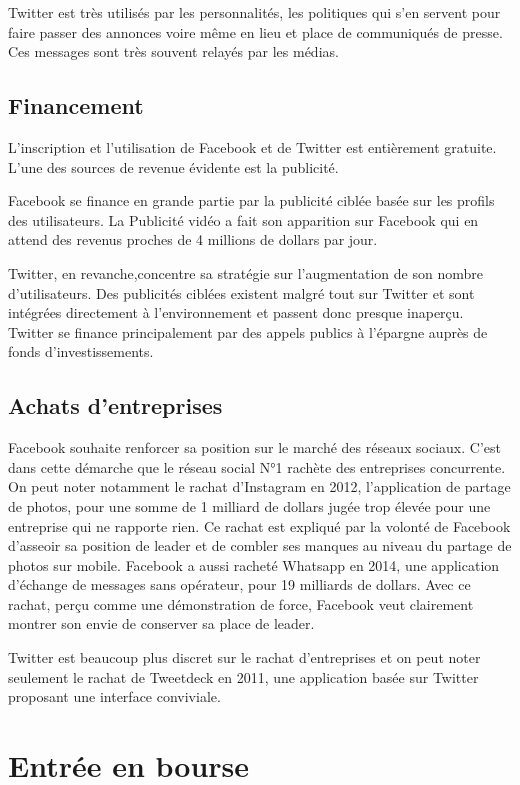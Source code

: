 \documentclass[a4paper,10pt]{article}
\begin{document}
Twitter est très utilisés par les personnalités, les politiques qui s'en servent pour faire passer des annonces voire même en lieu et place de communiqués de presse. Ces messages sont très souvent relayés par les médias.


\subsection{Financement}

L'inscription et l'utilisation de Facebook et de Twitter est entièrement gratuite. L'une des sources de revenue évidente est la publicité.

Facebook se finance en grande partie par la publicité ciblée basée sur les profils des utilisateurs. La Publicité vidéo a fait son apparition sur Facebook qui en attend des revenus proches de 4 millions de dollars par jour.

Twitter, en revanche,concentre sa stratégie sur l'augmentation de son nombre d'utilisateurs. Des publicités ciblées existent malgré tout sur Twitter et sont intégrées directement à l'environnement et passent donc presque inaperçu. Twitter se finance principalement par des appels publics à l'épargne auprès de fonds d’investissements.

\subsection{Achats d'entreprises}

Facebook souhaite renforcer sa position sur le marché des réseaux sociaux. C'est dans cette démarche que le réseau social N°1 rachète des entreprises concurrente. On peut noter notamment le rachat d'Instagram en 2012, l'application de partage de photos, pour une somme de 1 milliard de dollars jugée trop élevée pour une entreprise qui ne rapporte rien. Ce rachat est expliqué par la volonté de Facebook d’asseoir sa position de leader et de combler ses manques au niveau du partage de photos sur mobile.
Facebook a aussi racheté Whatsapp en 2014, une application d'échange de messages sans opérateur, pour 19 milliards de dollars. Avec ce rachat, perçu comme une démonstration de force, Facebook veut clairement montrer son envie de conserver sa place de leader.


Twitter est beaucoup plus discret sur le rachat d'entreprises et on peut noter seulement le rachat de Tweetdeck en 2011, une application basée sur Twitter proposant une interface conviviale.

\section{Entrée en bourse}
\end{document}
